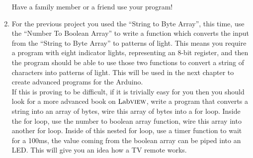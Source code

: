 \begin{enumerate}
	Have a family member or a friend use your program!\\
	
	\item For the previous project you used the ``String to Byte Array'', this time, use the ``Number To Boolean Array'' to write a function which converts the input from the ``String to Byte Array'' to patterns of light. This means you require a program with eight indicator lights, representing an 8-bit register, and then the program should be able to use those two functions to convert a string of characters into patterns of light. This will be used in the next chapter to create advanced programs for the Arduino.\\
	
	If this is proving to be difficult, if it is trivially easy for you then you should look for a more advanced book on $\text{Lab}\textsc{view}$, write a program that converts a string into an array of bytes, wire this array of bytes into a for loop. Inside the for loop, use the number to boolean array function, wire this array into another for loop. Inside of this nested for loop, use a timer function to wait for a 100ms, the value coming from the boolean array can be piped into an LED. This will give you an idea how a TV remote works.
\end{enumerate}